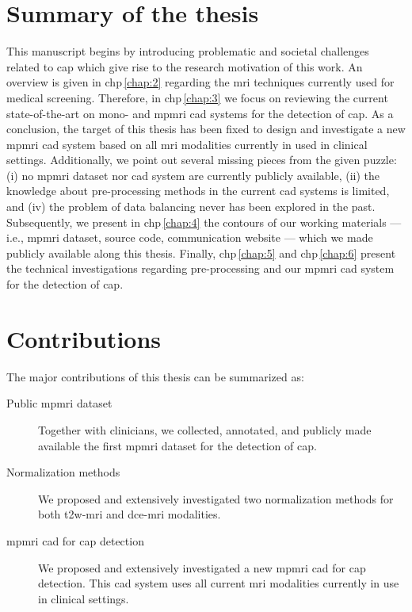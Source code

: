 \section{Summary of the thesis}

This manuscript begins by introducing problematic and societal challenges related to \ac{cap} which give rise to the research motivation of this work.
An overview is given in \acs{chp}\,\ref{chap:2} regarding the \ac{mri} techniques currently used for medical screening.
Therefore, in \acs{chp}\,\ref{chap:3} we focus on reviewing the current state-of-the-art on mono- and \ac{mpmri} \ac{cad} systems for the detection of \ac{cap}.
As a conclusion, the target of this thesis has been fixed to design and investigate a new \ac{mpmri} \ac{cad} system based on all \ac{mri} modalities currently in used in clinical settings.
Additionally, we point out several missing pieces from the given puzzle: (i) no \ac{mpmri} dataset nor \ac{cad} system are currently publicly available, (ii) the knowledge about pre-processing methods in the current \ac{cad} systems is limited, and (iv) the problem of data balancing never has been explored in the past.
Subsequently, we present in \acs{chp}\,\ref{chap:4} the contours of our working materials --- i.e., \ac{mpmri} dataset, source code, communication website --- which we made publicly available along this thesis.
Finally, \acs{chp}\,\ref{chap:5} and \acs{chp}\,\ref{chap:6} present the technical investigations regarding pre-processing and our \ac{mpmri} \ac{cad} system for the detection of \ac{cap}.

\section{Contributions}

The major contributions of this thesis can be summarized as:

\begin{description}
\item[Public \ac{mpmri} dataset] Together with clinicians, we collected, annotated, and publicly made available the first \ac{mpmri} dataset for the detection of \ac{cap}.
\item[Normalization methods] We proposed and extensively investigated two normalization methods for both \ac{t2w}-\ac{mri} and \ac{dce}-\ac{mri} modalities.
\item[\Ac{mpmri} \ac{cad} for \ac{cap} detection] We proposed and extensively investigated a new \ac{mpmri} \ac{cad} for \ac{cap} detection.
This \ac{cad} system uses all current \ac{mri} modalities currently in use in clinical settings.
\end{description}

